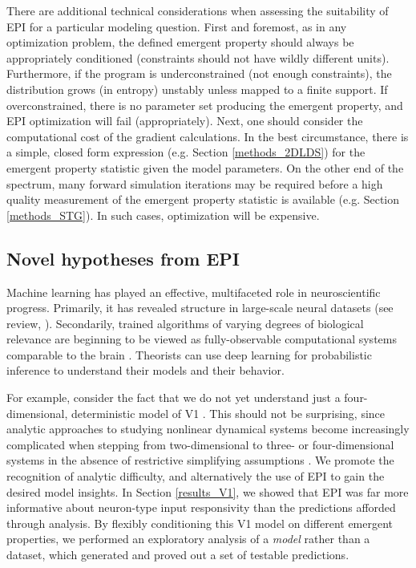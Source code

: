 \documentclass[11pt]{article}
\begin{document}
There are additional technical considerations when assessing the suitability of EPI for a particular modeling question.  
First and foremost, as in any optimization problem, the defined emergent property should always be appropriately conditioned (constraints should not have wildly different units).  
Furthermore, if the program is underconstrained (not enough constraints), the distribution grows (in entropy) unstably unless mapped to a finite support.  
If overconstrained, there is no parameter set producing the emergent property, and EPI optimization will fail (appropriately).
Next, one should consider the computational cost of the gradient calculations. 
In the best circumstance, there is a simple, closed form expression (e.g. Section \ref{methods_2DLDS}) for the emergent property statistic given the model parameters.  
On the other end of the spectrum, many forward simulation iterations may be required before a high quality measurement of the emergent property statistic is available  (e.g. Section \ref{methods_STG}).  In such cases, optimization will be expensive.

\subsection{Novel hypotheses from EPI} 
Machine learning has played an effective, multifaceted role in neuroscientific progress. 
Primarily, it has revealed structure in large-scale neural datasets \cite{kass2001spike, brown1998statistical, paninski2004maximum, byron2009gaussian, latimer2015single, duncker2019learning} (see review, \cite{paninski2018neural}).  
Secondarily, trained algorithms of varying degrees of biological relevance are beginning to be viewed as fully-observable computational systems comparable to the brain \cite{ sussillo2013opening, richards2019deep}.  
Theorists can use deep learning for probabilistic inference to understand their models and their behavior.

For example, consider the fact that we do not yet understand just a four-dimensional, deterministic model of V1 \cite{litwin2016inhibitory}.  
This should not be surprising, since analytic approaches to studying nonlinear dynamical systems become increasingly complicated when stepping from two-dimensional to three- or four-dimensional systems in the absence of restrictive simplifying assumptions \cite{strogatz1994nonlinear}. 
We promote the recognition of analytic difficulty, and alternatively the use of EPI to gain the desired model insights.
In Section \ref{results_V1}, we showed that EPI was far more informative about neuron-type input responsivity than the predictions afforded through analysis.
By flexibly conditioning this V1 model on different emergent properties, we performed an exploratory analysis of a \emph{model} rather than a dataset, which generated and proved out a set of testable predictions.
\end{document}
